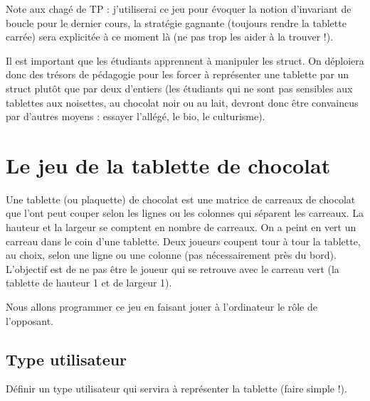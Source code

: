 




\begin{correction}
  Note aux chagé de TP : j'utiliserai ce jeu pour évoquer la notion
  d'invariant de boucle pour le dernier cours, la stratégie gagnante
  (toujours rendre la tablette carrée) sera explicitée à ce moment là
  (ne pas trop les aider à la trouver !).

  Il est important que les étudiants apprennent à manipuler les
  struct. On déploiera donc des trésors de pédagogie pour les forcer à
  représenter une tablette par un struct plutôt que par deux
  d'entiers (les étudiants qui ne sont pas sensibles aux tablettes aux
  noisettes, au chocolat noir ou au lait, devront donc être convaincus
  par d'autres moyens : essayer l'allégé, le bio, le culturisme).
\end{correction}

\section{Le jeu de la tablette de chocolat}

Une tablette (ou plaquette) de chocolat est une matrice de carreaux de
chocolat que l'ont peut couper selon les lignes ou les colonnes qui
séparent les carreaux. La hauteur et la largeur se comptent en nombre
de carreaux. On a peint en vert un carreau dans le coin d'une
tablette. Deux joueurs coupent tour à tour la tablette, au choix,
selon une ligne ou une colonne (pas nécessairement près du
bord). L'objectif est de ne pas être le joueur qui se retrouve avec le
carreau vert (la tablette de hauteur 1 et de largeur 1).

Nous allons programmer ce jeu en faisant jouer à l'ordinateur le rôle
de l'opposant.

\subsection{Type utilisateur}

Définir un type utilisateur qui servira à représenter la tablette
(faire simple !).


